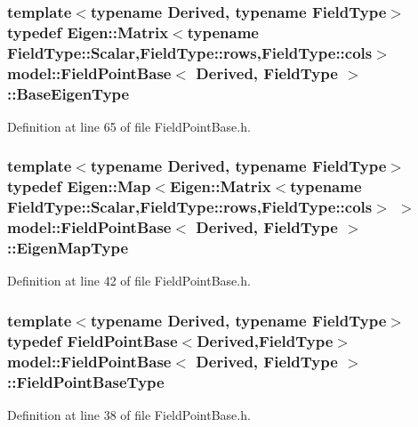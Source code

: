 \subsubsection[{Base\+Eigen\+Type}]{\setlength{\rightskip}{0pt plus 5cm}template$<$typename Derived, typename Field\+Type$>$ typedef Eigen\+::\+Matrix$<$typename Field\+Type\+::\+Scalar,Field\+Type\+::rows,Field\+Type\+::cols$>$ {\bf model\+::\+Field\+Point\+Base}$<$ Derived, Field\+Type $>$\+::{\bf Base\+Eigen\+Type}}\label{structmodel_1_1_field_point_base_aa9d600abaa521d1bbc6357203da99dde}


Definition at line 65 of file Field\+Point\+Base.\+h.

\hypertarget{structmodel_1_1_field_point_base_a595d9a8b475233f7197b3ad3659df94e}{}
\subsubsection[{Eigen\+Map\+Type}]{\setlength{\rightskip}{0pt plus 5cm}template$<$typename Derived, typename Field\+Type$>$ typedef Eigen\+::\+Map$<$Eigen\+::\+Matrix$<$typename Field\+Type\+::\+Scalar,Field\+Type\+::rows,Field\+Type\+::cols$>$ $>$ {\bf model\+::\+Field\+Point\+Base}$<$ Derived, Field\+Type $>$\+::{\bf Eigen\+Map\+Type}}\label{structmodel_1_1_field_point_base_a595d9a8b475233f7197b3ad3659df94e}


Definition at line 42 of file Field\+Point\+Base.\+h.

\hypertarget{structmodel_1_1_field_point_base_af0913f98b672e5e02c75754aed6e0355}{}
\subsubsection[{Field\+Point\+Base\+Type}]{\setlength{\rightskip}{0pt plus 5cm}template$<$typename Derived, typename Field\+Type$>$ typedef {\bf Field\+Point\+Base}$<$Derived,Field\+Type$>$ {\bf model\+::\+Field\+Point\+Base}$<$ Derived, Field\+Type $>$\+::{\bf Field\+Point\+Base\+Type}}\label{structmodel_1_1_field_point_base_af0913f98b672e5e02c75754aed6e0355}


Definition at line 38 of file Field\+Point\+Base.\+h.

